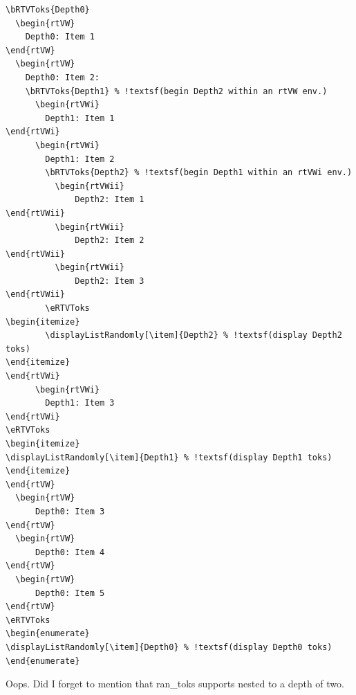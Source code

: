 \documentclass{article}
\let\pkg\textsf
\begin{document}
\begin{Verbatim}[commandchars=!(),fontsize=\small]
\bRTVToks{Depth0}
  \begin{rtVW}
    Depth0: Item 1
\end{rtVW}
  \begin{rtVW}
    Depth0: Item 2:
    \bRTVToks{Depth1} % !textsf(begin Depth2 within an rtVW env.)
      \begin{rtVWi}
        Depth1: Item 1
\end{rtVWi}
      \begin{rtVWi}
        Depth1: Item 2
        \bRTVToks{Depth2} % !textsf(begin Depth1 within an rtVWi env.)
          \begin{rtVWii}
              Depth2: Item 1
\end{rtVWii}
          \begin{rtVWii}
              Depth2: Item 2
\end{rtVWii}
          \begin{rtVWii}
              Depth2: Item 3
\end{rtVWii}
        \eRTVToks
\begin{itemize}
        \displayListRandomly[\item]{Depth2} % !textsf(display Depth2 toks)
\end{itemize}
\end{rtVWi}
      \begin{rtVWi}
        Depth1: Item 3
\end{rtVWi}
\eRTVToks
\begin{itemize}
\displayListRandomly[\item]{Depth1} % !textsf(display Depth1 toks)
\end{itemize}
\end{rtVW}
  \begin{rtVW}
      Depth0: Item 3
\end{rtVW}
  \begin{rtVW}
      Depth0: Item 4
\end{rtVW}
  \begin{rtVW}
      Depth0: Item 5
\end{rtVW}
\eRTVToks
\begin{enumerate}
\displayListRandomly[\item]{Depth0} % !textsf(display Depth0 toks)
\end{enumerate}
\end{Verbatim}
Oops. Did I forget to mention that \pkg{ran\_toks} supports nested to a depth of two.
\end{document}
